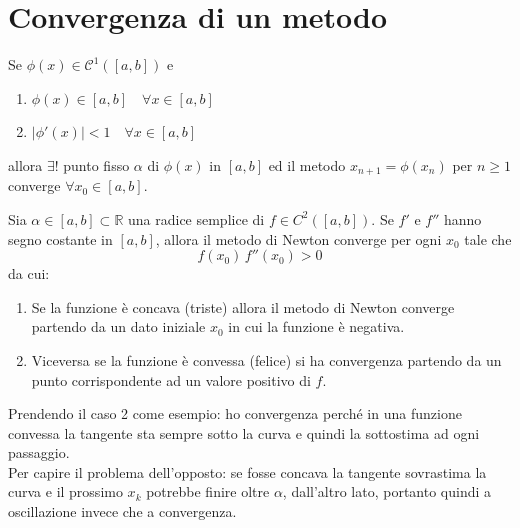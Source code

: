 \documentclass[12pt,a4paper,]{report}
\begin{document}
\section{Convergenza di un metodo}
\begin{teorema}
    Se $\phi(x) \in \mathcal{C}^1([a,b])$ e 
    \begin{enumerate}
        \item $\phi(x) \in [a,b] \quad\forall x \in [a,b]$
        \item $|\phi'(x)| <1  \quad\forall x \in [a,b]$
    \end{enumerate}
    allora $\exists !$ punto fisso $\alpha$ di $\phi(x)$ in $[a,b]$ ed il metodo $x_{n+1} = \phi(x_n)$ per $n\geq 1 $ converge $\forall x_0 \in[a,b]$.
\end{teorema}
\begin{teorema}
    Sia $\alpha \in [a,b] \subset \mathbb{R}$ una radice semplice di
    $f \in C^{2}([a,b])$.
    Se $f'$ e $f''$ hanno segno costante in $[a,b]$,
    allora il metodo di Newton converge per ogni $x_0$ tale che
    \[
    f(x_0)\,f''(x_0) > 0
    \]
    da cui:
    \begin{enumerate}
        \item Se la funzione è concava (triste) allora il metodo di Newton converge partendo da un dato iniziale $x_0$ in cui la funzione è negativa. 
        \item Viceversa se la funzione è convessa (felice) si ha convergenza partendo da un punto corrispondente ad un valore positivo di $f$.
    \end{enumerate}
    \begin{nota}
        Prendendo il caso 2 come esempio: ho convergenza perché in una funzione convessa la tangente sta sempre sotto la curva e quindi la sottostima ad ogni passaggio.\\
        Per capire il problema dell'opposto: se fosse concava la tangente sovrastima la curva e il prossimo $x_k$ potrebbe finire oltre $\alpha$, dall'altro lato, portanto quindi a oscillazione invece che a convergenza.
    \end{nota}
\end{teorema}
\end{document}
